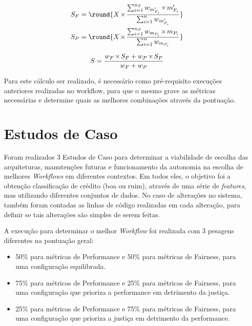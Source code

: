 \documentclass{article}
\DeclarePairedDelimiter{\round}\lfloor\rceil
\let\oldtimes\times
\def\times{{\mkern1mu\oldtimes\mkern1mu}}
\begin{document}
\begin{equation}
\label{eqn:groupScores}
	\begin{aligned}
	S_F = \round{X \times \frac{\sum_{i=1}^{n_F} w_{m'_{F_i}} \times m'_{F_i}}{\sum_{i=1}^{n} w_{m'_{F_i}}}}\\
	S_P = \round{X \times \frac{\sum_{i=1}^{n_P} w_{m_{P_i}} \times m_{P_i}}{\sum_{i=1}^{n} w_{m_{P_i}}}}
	\end{aligned}
\end{equation}

\begin{equation}
\label{eqn:totalScore}
	S = \frac{w_F \times S_F + w_P \times S_P}{w_F + w_P}
\end{equation}

Para este cálculo ser realizado, é necessário como pré-requisito execuções anteriores realizadas no workflow, para que o mesmo grave as métricas necessárias e determine quais as melhores combinações através da pontuação.

\section{Estudos de Caso}

Foram realizados 3 Estudos de Caso para determinar a viabilidade de escolha das arquiteturas, manutenções futuras e funcionamento da autonomia na escolha de melhores \textit{Workflows} em diferentes contextos. Em todos eles, o objetivo foi a obtenção classificação de crédito (boa ou ruim), através de uma série de \textit{features}, mas utilizando diferentes conjuntos de dados. No caso de alterações no sistema, também foram contadas as linhas de código realizadas em cada alteração, para definir se tais alterações são simples de serem feitas.

A execução para determinar o melhor \textit{Workflow} foi realizada com 3 pesagens diferentes na pontuação geral:

\begin{itemize}
\item 50\% para métricas de Performance e 50\% para métricas de Fairness, para uma configuração equilibrada.
\item 75\% para métricas de Performance e 25\% para métricas de Fairness, para uma configuração que prioriza a performance em detrimento da justiça.
\item 25\% para métricas de Performance e 75\% para métricas de Fairness, para uma configuração que prioriza a justiça em detrimento da performance.
\end{itemize}
\end{document}
